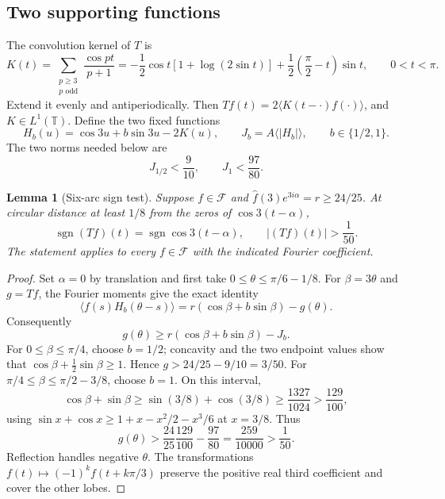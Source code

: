 \documentclass[11pt,reqno]{amsart}
\numberwithin{equation}{section}
\newtheorem{lemma}[theorem]{Lemma}
\theoremstyle{definition}
\theoremstyle{remark}
\newcommand{\T}{\mathbb T}
\newcommand{\ac}[1]{\langle #1\rangle}
\DeclareMathOperator{\sgn}{sgn}
\begin{document}
\subsection{Two supporting functions}
The convolution kernel of $T$ is
\begin{equation}\label{eq:continuous-kernel}
 K(t)=\sum_{\substack{p\ge3\\p\text{ odd}}}\frac{\cos pt}{p+1}
 =-\frac12\cos t[1+\log(2\sin t)]
   +\frac12\left(\frac\pi2-t\right)\sin t,
 \qquad 0<t<\pi.
\end{equation}
Extend it evenly and antiperiodically. Then $Tf(t)=2\ac{K(t-\cdot)f(\cdot)}$, and $K\in L^1(\T)$. Define the two fixed functions
\begin{equation}\label{eq:fixed-witness}
 H_b(u)=\cos3u+b\sin3u-2K(u),\qquad
 J_b=A\ac{|H_b|},\qquad b\in\{1/2,1\}.
\end{equation}
The two norms needed below are
\begin{equation}\label{eq:fixed-norms}
 J_{1/2}<\frac9{10},\qquad J_1<\frac{97}{80}.
\end{equation}

\begin{lemma}[Six-arc sign test]\label{lem:sign-test}
Suppose $f\in\mathcal F$ and $\widehat f(3)e^{3i\alpha}=r\ge24/25$. At circular distance at least $1/8$ from the zeros of $\cos3(t-\alpha)$,
\begin{equation}\label{eq:sign-test}
 \sgn(Tf)(t)=\sgn\cos3(t-\alpha),\qquad |(Tf)(t)|>\frac1{50}.
\end{equation}
The statement applies to every $f\in\mathcal F$ with the indicated Fourier coefficient.
\end{lemma}
\begin{proof}
Set $\alpha=0$ by translation and first take $0\le\theta\le\pi/6-1/8$. For $\beta=3\theta$ and $g=Tf$, the Fourier moments give the exact identity
\[
 \ac{f(s)H_b(\theta-s)}=r(\cos\beta+b\sin\beta)-g(\theta).
\]
Consequently
\begin{equation}\label{eq:support-plane}
 g(\theta)\ge r(\cos\beta+b\sin\beta)-J_b.
\end{equation}
For $0\le\beta\le\pi/4$, choose $b=1/2$; concavity and the two endpoint values show that $\cos\beta+\tfrac12\sin\beta\ge1$. Hence $g>24/25-9/10=3/50$. For $\pi/4\le\beta\le\pi/2-3/8$, choose $b=1$. On this interval,
\[
 \cos\beta+\sin\beta\ge\sin(3/8)+\cos(3/8)
 \ge\frac{1327}{1024}>\frac{129}{100},
\]
using $\sin x+\cos x\ge1+x-x^2/2-x^3/6$ at $x=3/8$. Thus
\[
 g(\theta)>\frac{24}{25}\frac{129}{100}-\frac{97}{80}
 =\frac{259}{10000}>\frac1{50}.
\]
Reflection handles negative $\theta$. The transformations $f(t)\mapsto(-1)^kf(t+k\pi/3)$ preserve the positive real third coefficient and cover the other lobes.
\end{proof}
\end{document}
